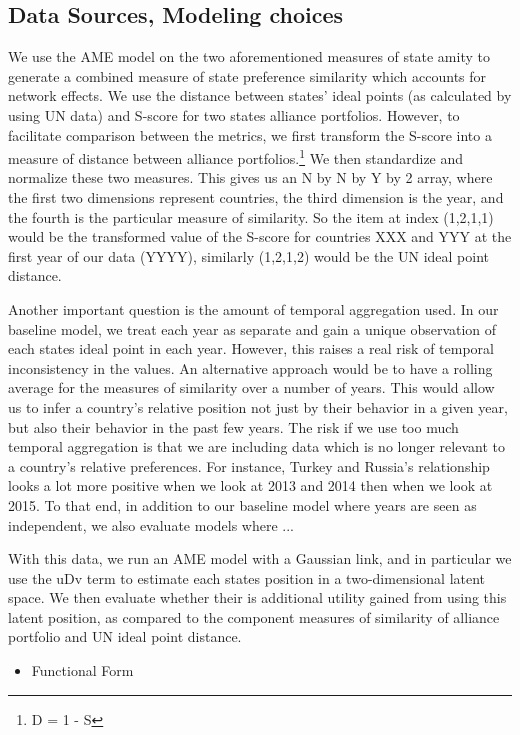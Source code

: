 \subsection{Data Sources, Modeling choices}

We use the AME model on the two aforementioned measures of state amity to generate a combined measure of state preference similarity which accounts for network effects. We use the distance between states' ideal points (as calculated by \citet{voeten:XXXX} using UN data) and S-score for two states alliance portfolios. However, to facilitate comparison between the metrics, we first transform the S-score into a measure of distance between alliance portfolios.\footnote{D = 1 - S} We then standardize and normalize these two measures. This gives us an N by N by Y by 2 array, where the first two dimensions represent countries, the third dimension is the year, and the fourth is the particular measure of similarity. So the item at index (1,2,1,1) would be the transformed value of the S-score for countries XXX and YYY at the first year of our data (YYYY), similarly (1,2,1,2) would be the UN ideal point distance.

Another important question is the amount of temporal aggregation used. In our baseline model, we treat each year as separate and gain a unique observation of each states ideal point in each year. However, this raises a real risk of temporal inconsistency in the values. An alternative approach would be to have a rolling average for the measures of similarity over a number of years. This would allow us to infer a country's relative position not just by their behavior in a given year, but also their behavior in the past few years. The risk if we use too much temporal aggregation is that we are including data which is no longer relevant to a country's relative preferences. For instance, Turkey and Russia's relationship looks a lot more positive when we look at 2013 and 2014 then when we look at 2015. To that end, in addition to our baseline model where years are seen as independent, we also evaluate models where ... 

With this data, we run an AME model with a Gaussian link, and in particular we use the uDv term to estimate each states position in a two-dimensional latent space. We then evaluate whether their is additional utility gained from using this latent position, as compared to the component measures of similarity of alliance portfolio and UN ideal point distance.

\begin{itemize}
	\item Functional Form
\end{itemize}

